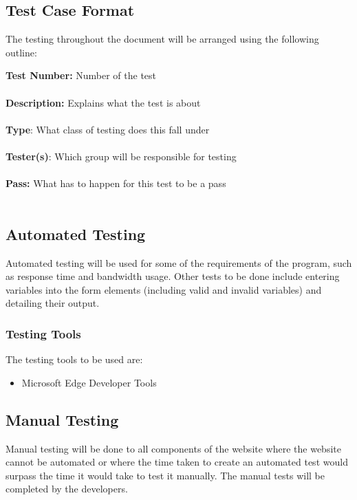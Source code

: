 \documentclass[12pt]{article}
\begin{document}
\subsection{Test Case Format}
The testing throughout the document will be arranged using the following outline:
\begin{tcolorbox}
\textbf{Test Number:} Number of the test \\ \\
\textbf{Description:} Explains what the test is about \\ \\
\textbf{Type}: What class of testing does this fall under \\ \\
\textbf{Tester(s)}: Which group will be responsible for testing \\ \\
\textbf{Pass:} What has to happen for this test to be a pass \\ \\
\end{tcolorbox}

\subsection{Automated Testing}
Automated testing will be used for some of the requirements of the program, such as response time and bandwidth usage. Other tests to be done include entering variables into the form elements (including valid and invalid variables) and detailing their output.

\subsubsection{Testing Tools}
The testing tools to be used are:
\begin{itemize}
\item Microsoft Edge Developer Tools
\end{itemize}

\subsection{Manual Testing}
Manual testing will be done to all components of the website where the website cannot be automated or where the time taken to create an automated test would surpass the time it would take to test it manually. The manual tests will be completed by the developers.
\end{document}
